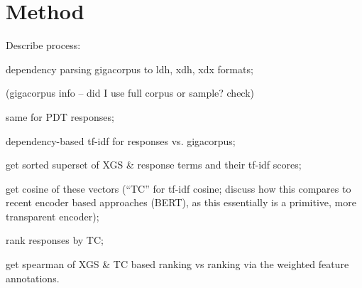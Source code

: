 \chapter{Method}
Describe process:

dependency parsing gigacorpus to ldh, xdh, xdx formats;

(gigacorpus info -- did I use full corpus or sample? check)

same for PDT responses;

dependency-based tf-idf for responses vs. gigacorpus;

get sorted superset of XGS \& response terms and their tf-idf scores;

get cosine of these vectors (``TC'' for tf-idf cosine; discuss how this compares to recent encoder based approaches (BERT), as this essentially is a primitive, more transparent encoder);

rank responses by TC;

get spearman of XGS \& TC based ranking vs ranking via the weighted feature annotations.

